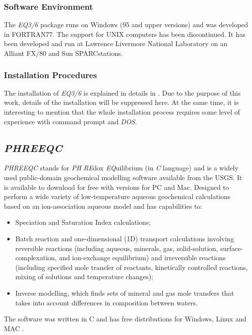 \documentclass[ppgc,mestrado,english]{iiufrgs}
\begin{document}
\subsubsection{Software Environment}
The \emph{EQ3/6} package runs on Windows (95 and upper versions) and was developed in FORTRAN77. The support for UNIX computers has been discontinued.  It has been developed and run at Lawrence Livermore National Laboratory on an Alliant FX/80 and Sun SPARCstations.
\subsubsection{Installation Procedures}
The installation of \emph{EQ3/6} is explained in details in \cite{Wolery:92}. Due to the purpose of this work, details of the installation will be suppressed here. At the same time, it is interesting to mention that the whole installation process requires some level of experience with command prompt and \emph{DOS}.

\subsection{\emph{PHREEQC}}
\emph{PHREEQC} stands for \emph{PH} \emph{RE}dox \emph{EQ}uilibrium (in \emph{C} language) and is a widely used public-domain geochemical modelling software available from the USGS. It is available to download for free with versions for PC and Mac. Designed to perform a wide variety of low-temperature aqueous geochemical calculations based on an ion-association aqueous model and has capabilities to:
\begin{itemize}
\item Speciation and Saturation Index calculations;
\item Batch reaction and one-dimensional (1D) transport calculations involving reversible reactions (including aqueous, minerals, gas, solid-solution, surface-complexation, and ion-exchange equilibrium) and irreversible reactions (including specified mole transfer of reactants, kinetically controlled reactions, mixing of solutions and temperature changes);
\item Inverse modelling, which finds sets of mineral and gas mole transfers that takes into account differences in composition between waters.
\end{itemize}
The software was written in C and has free distributions for Windows, Linux and MAC \cite{Parkhurst:80}.
\end{document}
